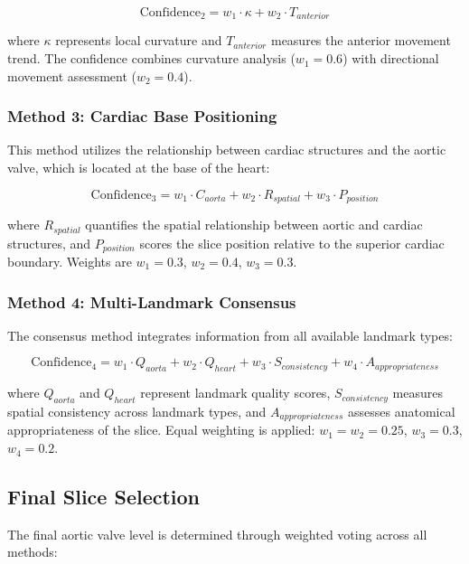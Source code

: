 \documentclass[11pt,a4paper]{article}
\begin{document}
\begin{equation}
\text{Confidence}_2 = w_1 \cdot \kappa + w_2 \cdot T_{anterior}
\end{equation}

where $\kappa$ represents local curvature and $T_{anterior}$ measures the anterior movement trend. The confidence combines curvature analysis ($w_1 = 0.6$) with directional movement assessment ($w_2 = 0.4$).

\subsubsection{Method 3: Cardiac Base Positioning}
This method utilizes the relationship between cardiac structures and the aortic valve, which is located at the base of the heart:

\begin{equation}
\text{Confidence}_3 = w_1 \cdot C_{aorta} + w_2 \cdot R_{spatial} + w_3 \cdot P_{position}
\end{equation}

where $R_{spatial}$ quantifies the spatial relationship between aortic and cardiac structures, and $P_{position}$ scores the slice position relative to the superior cardiac boundary. Weights are $w_1 = 0.3$, $w_2 = 0.4$, $w_3 = 0.3$.

\subsubsection{Method 4: Multi-Landmark Consensus}
The consensus method integrates information from all available landmark types:

\begin{equation}
\text{Confidence}_4 = w_1 \cdot Q_{aorta} + w_2 \cdot Q_{heart} + w_3 \cdot S_{consistency} + w_4 \cdot A_{appropriateness}
\end{equation}

where $Q_{aorta}$ and $Q_{heart}$ represent landmark quality scores, $S_{consistency}$ measures spatial consistency across landmark types, and $A_{appropriateness}$ assesses anatomical appropriateness of the slice. Equal weighting is applied: $w_1 = w_2 = 0.25$, $w_3 = 0.3$, $w_4 = 0.2$.

\subsection{Final Slice Selection}

The final aortic valve level is determined through weighted voting across all methods:
\end{document}
